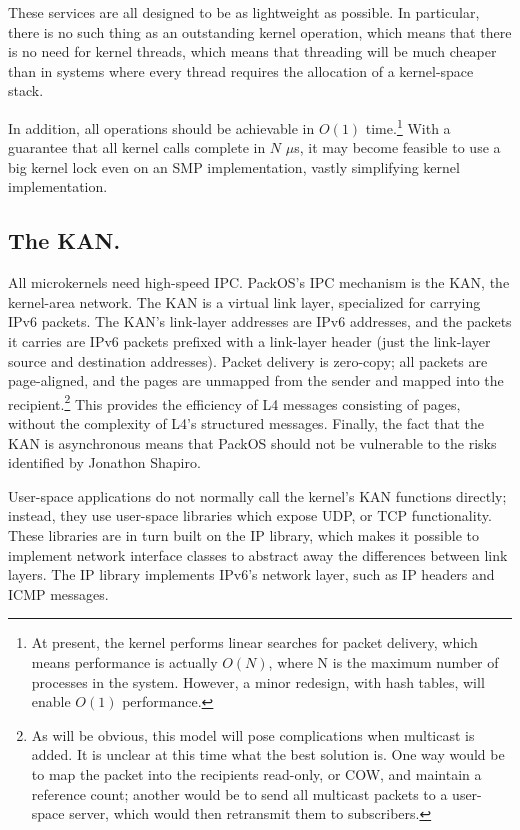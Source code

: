 \documentclass{article}
\begin{document}
These services are all designed to be as lightweight as possible.  In
particular, there is no such thing as an outstanding kernel operation,
which means that there is no need for kernel threads, which means
that threading will be much cheaper than in systems where every thread
requires the allocation of a kernel-space stack.

In addition, all operations should be achievable in \(O(1)\)
time.\footnote{At present, the kernel performs linear searches for
packet delivery, which means performance is actually \(O(N)\), where N
is the maximum number of processes in the system.  However, a minor
redesign, with hash tables, will enable \(O(1)\) performance.} With a
guarantee that all kernel calls complete in \(N\) \(\mu\)s, it may
become feasible to use a big kernel lock even on an SMP
implementation, vastly simplifying kernel implementation.

\subsection{The KAN.}

All microkernels need high-speed IPC.\cite{Liedtke:AchievedIPC}
PackOS's IPC mechanism is the KAN, the
kernel-area network.  The KAN is a virtual link layer, specialized for
carrying IPv6 packets.  The KAN's link-layer addresses are IPv6
addresses, and the packets it carries are IPv6 packets prefixed with a
link-layer header (just the link-layer source and destination
addresses).  Packet delivery is zero-copy; all packets are
page-aligned, and the pages are unmapped from the sender and mapped
into the recipient.\footnote{As will be obvious, this model will pose
complications when multicast is added.  It is unclear at this time
what the best solution is.  One way would be to map the packet into
the recipients read-only, or COW, and maintain a reference count;
another would be to send all multicast packets to a user-space server,
which would then retransmit them to subscribers.} This provides the
efficiency of L4 messages consisting of pages, without the complexity
of L4's structured messages.  Finally, the fact that the KAN is
asynchronous means that PackOS should not be vulnerable to the risks
identified by Jonathon Shapiro.\cite{Shapiro:2003}

User-space applications do not normally call the kernel's KAN
functions directly; instead, they use user-space libraries which
expose UDP, or TCP functionality.  These libraries are in turn built
on the IP library, which makes it possible to implement network
interface classes to abstract away the differences between link
layers.  The IP library implements IPv6's network layer, such as IP
headers and ICMP messages.
\end{document}
